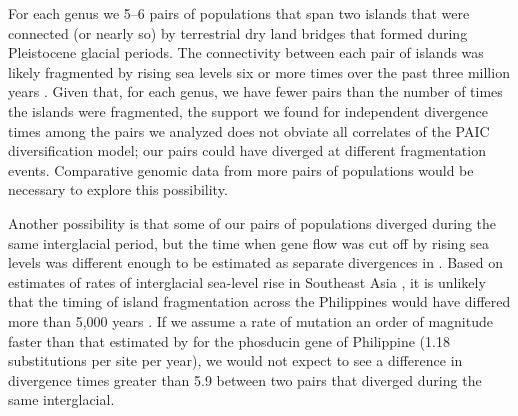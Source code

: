 For each genus we  5--6 pairs of populations that span two
islands that were connected (or nearly so) by terrestrial dry land bridges that
formed during Pleistocene glacial periods.
The connectivity between each pair of islands was likely fragmented by rising
sea levels six or more times over the past three million years
\citep{Rohling1998,Siddall2003}.
Given that, for each genus, we have fewer pairs than the number of times the
islands were fragmented,
the support we found for independent divergence times among the pairs we
analyzed does not obviate all correlates of the PAIC diversification model;
our pairs could have diverged at different fragmentation events.
Comparative genomic data from more pairs of populations would be necessary to
explore this possibility.


Another possibility is that some of our pairs of populations diverged during
the same interglacial period, but the time when gene flow was cut off by rising
sea levels was different enough to be estimated as separate divergences in
\ecoevolity.
Based on  estimates of rates of interglacial
sea-level rise in Southeast Asia \citep{Hanebuth2000,Sathiamurthy2006}, it is
unlikely that the timing of island fragmentation across the Philippines would
have differed more than 5,000 years .
If we assume a rate of mutation an order of magnitude faster than that
estimated by \citet{Siler2012} for the phosducin gene of Philippine 
(1.18 substitutions per site per year),
we would not expect to see a difference in divergence times greater than
5.9 
between two pairs that diverged during the same interglacial.

